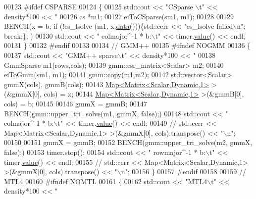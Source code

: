 \begin{DoxyCode}
{{00123 \textcolor{preprocessor}{    #ifdef CSPARSE}
00124     \{
00125       std::cout << \textcolor{stringliteral}{"CSparse \(\backslash\)t"} << density*100 << \textcolor{stringliteral}{"%
00126       cs *m1;
00127       eiToCSparse(sm1, m1);
00128 
00129       BENCH(x = b; \textcolor{keywordflow}{if} (!cs\_lsolve (m1, x.\hyperlink{class_eigen_1_1_plain_object_base_ac25699535374b1854cf8494e44ad31b2}{data}()))\{std::cerr << \textcolor{stringliteral}{"cs\_lsolve failed\(\backslash\)n"}; \textcolor{keywordflow}{break};\}; )
00130       std::cout << \textcolor{stringliteral}{"   colmajor^-1 * b:\(\backslash\)t"} << timer.\hyperlink{class_eigen_1_1_bench_timer_a26760f963ed8b64c126159bfea57735e}{value}() << endl;
00131     \}
00132 \textcolor{preprocessor}{    #endif}
00133 
00134     \textcolor{comment}{// GMM++}
00135 \textcolor{preprocessor}{    #ifndef NOGMM}
00136     \{
00137       std::cout << \textcolor{stringliteral}{"GMM++ sparse\(\backslash\)t"} << density*100 << \textcolor{stringliteral}{"%
00138       GmmSparse m1(rows,cols);
00139       gmm::csr\_matrix<Scalar> m2;
00140       eiToGmm(sm1, m1);
00141       gmm::copy(m1,m2);
00142       std::vector<Scalar> gmmX(cols), gmmB(cols);
00143       \hyperlink{group___core___module_class_eigen_1_1_map}{Map<Matrix<Scalar,Dynamic,1>} >(&gmmX[0], cols) = x;
00144       \hyperlink{group___core___module_class_eigen_1_1_map}{Map<Matrix<Scalar,Dynamic,1>} >(&gmmB[0], cols) = b;
00145 
00146       gmmX = gmmB;
00147       BENCH(gmm::upper\_tri\_solve(m1, gmmX, \textcolor{keyword}{false});)
00148       std::cout << \textcolor{stringliteral}{"   colmajor^-1 * b:\(\backslash\)t"} << timer.\hyperlink{class_eigen_1_1_bench_timer_a26760f963ed8b64c126159bfea57735e}{value}() << endl;
00149 \textcolor{comment}{//       std::cerr << Map<Matrix<Scalar,Dynamic,1> >(&gmmX[0], cols).transpose() << "\(\backslash\)n";}
00150 
00151       gmmX = gmmB;
00152       BENCH(gmm::upper\_tri\_solve(m2, gmmX, \textcolor{keyword}{false});)
00153       timer.stop();
00154       std::cout << \textcolor{stringliteral}{"   rowmajor^-1 * b:\(\backslash\)t"} << timer.\hyperlink{class_eigen_1_1_bench_timer_a26760f963ed8b64c126159bfea57735e}{value}() << endl;
00155 \textcolor{comment}{//       std::cerr << Map<Matrix<Scalar,Dynamic,1> >(&gmmX[0], cols).transpose() << "\(\backslash\)n";}
00156     \}
00157 \textcolor{preprocessor}{    #endif}
00158 
00159     \textcolor{comment}{// MTL4}
00160 \textcolor{preprocessor}{    #ifndef NOMTL}
00161     \{
00162       std::cout << \textcolor{stringliteral}{"MTL4\(\backslash\)t"} << density*100 << \textcolor{stringliteral}{"%
}}}}}
\end{DoxyCode}
